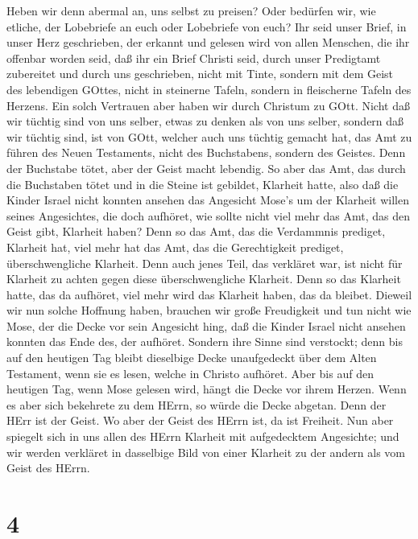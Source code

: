  Heben wir denn abermal an, uns selbst zu preisen? Oder
bedürfen wir, wie etliche, der Lobebriefe an euch oder Lobebriefe von
euch?  Ihr seid unser Brief, in unser Herz geschrieben, der
erkannt und gelesen wird von allen Menschen,  die ihr
offenbar worden seid, daß ihr ein Brief Christi seid, durch unser
Predigtamt zubereitet und durch uns geschrieben, nicht mit Tinte,
sondern mit dem Geist des lebendigen GOttes, nicht in steinerne Tafeln,
sondern in fleischerne Tafeln des Herzens.  Ein solch
Vertrauen aber haben wir durch Christum zu GOtt.  Nicht daß
wir tüchtig sind von uns selber, etwas zu denken als von uns selber,
sondern daß wir tüchtig sind, ist von GOtt,  welcher auch
uns tüchtig gemacht hat, das Amt zu führen des Neuen Testaments, nicht
des Buchstabens, sondern des Geistes. Denn der Buchstabe tötet, aber der
Geist macht lebendig.  So aber das Amt, das durch die
Buchstaben tötet und in die Steine ist gebildet, Klarheit hatte, also
daß die Kinder Israel nicht konnten ansehen das Angesicht Mose's um der
Klarheit willen seines Angesichtes, die doch aufhöret,  wie
sollte nicht viel mehr das Amt, das den Geist gibt, Klarheit haben?
 Denn so das Amt, das die Verdammnis prediget, Klarheit hat,
viel mehr hat das Amt, das die Gerechtigkeit prediget, überschwengliche
Klarheit.  Denn auch jenes Teil, das verkläret war, ist
nicht für Klarheit zu achten gegen diese überschwengliche Klarheit.
 Denn so das Klarheit hatte, das da aufhöret, viel mehr
wird das Klarheit haben, das da bleibet.  Dieweil wir nun
solche Hoffnung haben, brauchen wir große Freudigkeit  und
tun nicht wie Mose, der die Decke vor sein Angesicht hing, daß die
Kinder Israel nicht ansehen konnten das Ende des, der aufhöret.
 Sondern ihre Sinne sind verstockt; denn bis auf den
heutigen Tag bleibt dieselbige Decke unaufgedeckt über dem Alten
Testament, wenn sie es lesen, welche in Christo aufhöret. 
Aber bis auf den heutigen Tag, wenn Mose gelesen wird, hängt die Decke
vor ihrem Herzen.  Wenn es aber sich bekehrete zu dem
HErrn, so würde die Decke abgetan.  Denn der HErr ist der
Geist. Wo aber der Geist des HErrn ist, da ist Freiheit. 
Nun aber spiegelt sich in uns allen des HErrn Klarheit mit aufgedecktem
Angesichte; und wir werden verkläret in dasselbige Bild von einer
Klarheit zu der andern als vom Geist des HErrn.

\hypertarget{section-3}{%
\section{4}\label{section-3}}

